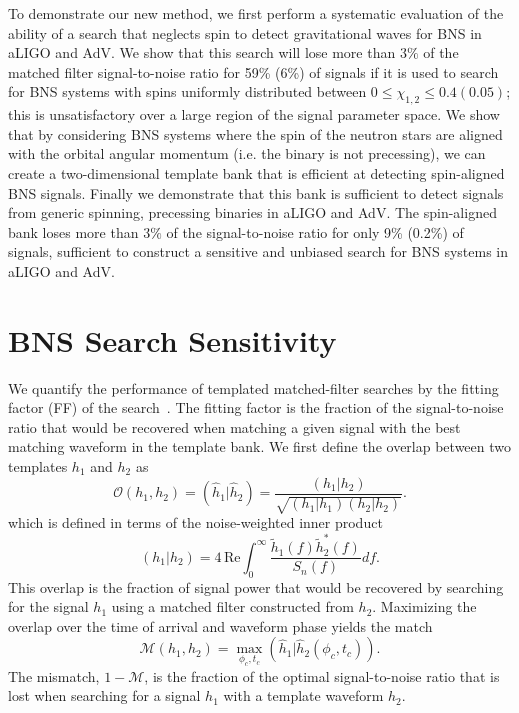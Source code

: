 To demonstrate our new method, we first perform a systematic evaluation of the ability
of a search that neglects spin to detect gravitational waves for BNS in aLIGO
and AdV.  We show that this search will lose more than $3\%$ of the
matched filter signal-to-noise ratio for 59\% (6\%) of signals if it is used to search
for BNS systems with spins uniformly distributed between $0 \le \chi_{1,2} \le
0.4 (0.05)$; this is unsatisfactory over a
large region of the signal parameter space. We show that by considering BNS
systems where the spin of the neutron stars are aligned with the orbital
angular momentum (i.e. the binary is not precessing), we can create a
two-dimensional template bank that is efficient at detecting spin-aligned BNS
signals. Finally we demonstrate that this bank is sufficient to detect signals
from generic spinning, precessing binaries in aLIGO and AdV. The spin-aligned
bank loses more than $3\%$ of the signal-to-noise ratio for only 9\% (0.2\%)
of signals, sufficient to construct a sensitive and unbiased search for BNS
systems in aLIGO and AdV.

\section{BNS Search Sensitivity}
\label{ssec:nonspin_performance}
\label{sec:spin_import}

We quantify the performance of templated matched-filter searches by the
fitting factor (FF) of the search~\cite{Apostolatos:1995pj}.  The fitting
factor is the fraction of the signal-to-noise ratio that would be recovered
when matching a given signal with the best matching waveform in the template
bank. We first define the overlap between two templates $h_1$ and $h_2$ as
%
\begin{equation}
\mathcal{O}(h_1,h_2) = (\hat{h}_1|\hat{h}_2) = \dfrac{(h_1|h_2)}{\sqrt{(h_1|h_1)(h_2|h_2)}}.
\end{equation}
%
which is defined in terms of the noise-weighted inner product~\cite{CF94}
%
\begin{equation}
(h_1|h_2) = 4 \, \mathrm{Re} \int^{\infty}_0\dfrac{\tilde{h}_1(f)\tilde{h}_2^*(f)}{S_n(f)} df.
\end{equation}
%
This overlap is the fraction of signal power that would be recovered by
searching for the signal $h_1$ using a matched filter constructed from $h_2$.
Maximizing the overlap over the time of arrival and waveform phase yields the
match
%
\begin{equation}
\mathcal{M}(h_1,h_2) = \underset{\phi_c,t_c}{\max}(\hat{h}_1|\hat{h}_2(\phi_c,t_c)).
\end{equation}
%
The mismatch, $1 - \mathcal{M}$, is the fraction of the optimal
signal-to-noise ratio that is lost when searching for a signal $h_1$ with
a template waveform $h_2$. 

